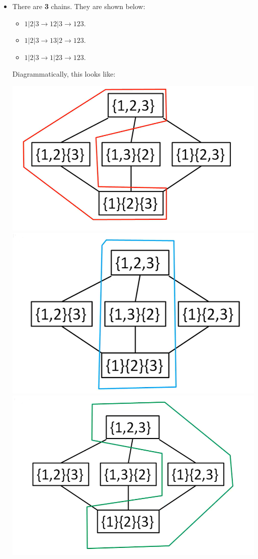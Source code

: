 \documentclass[letterpaper]{article}
\begin{document}
\begin{itemize}
    \item There are \textbf{3} chains. They are shown below:
    \begin{itemize}
        \item $1|2|3 \to 12|3 \to 123$.
        \item $1|2|3 \to 13|2 \to 123$.
        \item $1|2|3 \to 1|23 \to 123$.
    \end{itemize}
    Diagrammatically, this looks like:
    \begin{center}
        \includegraphics[scale=0.25]{hasse_1.PNG}
        \includegraphics[scale=0.25]{hasse_2.PNG}
        \includegraphics[scale=0.25]{hasse_3.PNG}

\end{center}
\end{itemize}
\end{document}
